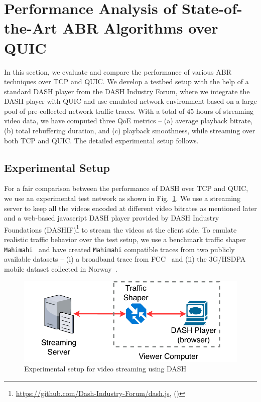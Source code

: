 \section{Performance Analysis of State-of-the-Art ABR Algorithms over QUIC}
In this section, we evaluate and compare the performance of various ABR
techniques over TCP and QUIC. We develop a testbed setup with the help of a standard DASH player from the DASH Industry Forum, where we integrate the DASH player with QUIC and use emulated network environment based on a large pool of pre-collected network traffic traces. With a total of $45$ hours of streaming video data, we have computed three QoE metrics -- (a) average playback bitrate, (b) total rebuffering duration, and (c) playback smoothness, while streaming over both TCP and QUIC. The detailed experimental setup follows. 

\subsection{Experimental Setup}
\label{chap03s2:sec:experimentalSetup}
For a fair comparison between the performance of DASH over TCP and QUIC,
we use an experimental test network as shown in Fig.~\ref{fig:chap03s2:expeirmental_setup}. We use a streaming server to keep all the videos encoded at different video bitrates as mentioned later and a web-based javascript DASH player provided by DASH Industry Foundations (DASHIF)\footnote{\url{https://github.com/Dash-Industry-Forum/dash.js}, (\lastaccessedtoday)} to stream the videos at the client side. To emulate realistic traffic behavior over the test setup, we use a benchmark traffic shaper {\tt Mahimahi}~\cite{mahimahi} and have created {\tt Mahimahi} compatible traces from two publicly available datasets -- (i) a broadband trace from FCC~\cite{dataset-fcc} and (ii) the 3G/HSDPA mobile dataset collected in Norway~\cite{dataset-norway}.

\begin{figure}[h]
	\centering
	\includegraphics[width=0.8\linewidth]{img/experimental_setup}
	\caption{\label{fig:chap03s2:expeirmental_setup}Experimental setup for video streaming using DASH}
\end{figure}

